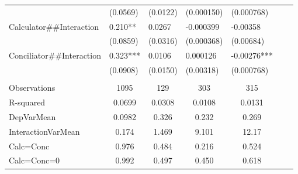 \begin{tabular}{rrrrrrr}
\multicolumn{1}{l}{} & \multicolumn{1}{l}{(0.0569)} & \multicolumn{1}{l}{(0.0122)} & \multicolumn{1}{l}{(0.000150)} & \multicolumn{1}{l}{(0.000768)} & \multicolumn{1}{l}{} & \multicolumn{1}{l}{} \\
\multicolumn{1}{l}{Calculator\#\#Interaction} & \multicolumn{1}{l}{0.210**} & \multicolumn{1}{l}{0.0267} & \multicolumn{1}{l}{-0.000399} & \multicolumn{1}{l}{-0.00358} & \multicolumn{1}{l}{} & \multicolumn{1}{l}{} \\
\multicolumn{1}{l}{} & \multicolumn{1}{l}{(0.0859)} & \multicolumn{1}{l}{(0.0316)} & \multicolumn{1}{l}{(0.000368)} & \multicolumn{1}{l}{(0.00684)} & \multicolumn{1}{l}{} & \multicolumn{1}{l}{} \\
\multicolumn{1}{l}{Conciliator\#\#Interaction} & \multicolumn{1}{l}{0.323***} & \multicolumn{1}{l}{0.0106} & \multicolumn{1}{l}{0.000126} & \multicolumn{1}{l}{-0.00276***} & \multicolumn{1}{l}{} & \multicolumn{1}{l}{} \\
\multicolumn{1}{l}{} & \multicolumn{1}{l}{(0.0908)} & \multicolumn{1}{l}{(0.0150)} & \multicolumn{1}{l}{(0.00318)} & \multicolumn{1}{l}{(0.000768)} & \multicolumn{1}{l}{} & \multicolumn{1}{l}{} \\
\multicolumn{1}{l}{} & \multicolumn{1}{l}{} & \multicolumn{1}{l}{} & \multicolumn{1}{l}{} & \multicolumn{1}{l}{} & \multicolumn{1}{l}{} &  \\
\midrule
\multicolumn{1}{l}{Observations} & \multicolumn{1}{c}{1095} & \multicolumn{1}{c}{129} & \multicolumn{1}{c}{303} & \multicolumn{1}{c}{315} & \multicolumn{1}{c}{} & \multicolumn{1}{c}{} \\
\multicolumn{1}{l}{R-squared} & \multicolumn{1}{c}{0.0699} & \multicolumn{1}{c}{0.0308} & \multicolumn{1}{c}{0.0108} & \multicolumn{1}{c}{0.0131} & \multicolumn{1}{c}{} & \multicolumn{1}{c}{} \\
\multicolumn{1}{l}{DepVarMean} & \multicolumn{1}{c}{0.0982} & \multicolumn{1}{c}{0.326} & \multicolumn{1}{c}{0.232} & \multicolumn{1}{c}{0.269} & \multicolumn{1}{c}{} & \multicolumn{1}{c}{} \\
\multicolumn{1}{l}{InteractionVarMean} & \multicolumn{1}{c}{0.174} & \multicolumn{1}{c}{1.469} & \multicolumn{1}{c}{9.101} & \multicolumn{1}{c}{12.17} & \multicolumn{1}{c}{} & \multicolumn{1}{c}{} \\
\multicolumn{1}{l}{Calc=Conc} & \multicolumn{1}{c}{0.976} & \multicolumn{1}{c}{0.484} & \multicolumn{1}{c}{0.216} & \multicolumn{1}{c}{0.524} & \multicolumn{1}{c}{} & \multicolumn{1}{c}{} \\
\multicolumn{1}{l}{Calc=Conc=0} & \multicolumn{1}{c}{0.992} & \multicolumn{1}{c}{0.497} & \multicolumn{1}{c}{0.450} & \multicolumn{1}{c}{0.618} & \multicolumn{1}{c}{} & \multicolumn{1}{c}{} \\
\bottomrule
\bottomrule
\end{tabular}%
